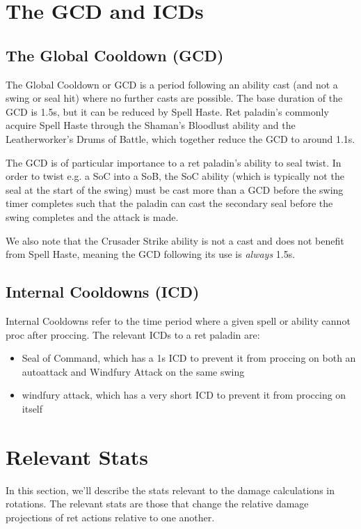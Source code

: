 \documentclass[letterpaper,11pt]{article}
\begin{document}
	\section{The GCD and ICDs}
	\subsection{The Global Cooldown (GCD)}
	The Global Cooldown or GCD is a period following an ability cast (and not a swing or seal hit) where no further casts are possible.
	The base duration of the GCD is 1.5s, but it can be reduced by Spell Haste.
	Ret paladin's commonly acquire Spell Haste through the Shaman's Bloodlust ability and the Leatherworker's Drums of Battle, which together reduce the GCD to around 1.1s.
	
	The GCD is of particular importance to a ret paladin's ability to seal twist.
	In order to twist e.g. a SoC into a SoB, the SoC ability (which is typically not the seal at the start of the swing) must be cast more than a GCD before the swing timer completes such that the paladin can cast the secondary seal before the swing completes and the attack is made.
	
	We also note that the Crusader Strike ability is not a cast and does not benefit from Spell Haste, meaning the GCD following its use is \emph{always} 1.5s.
	
	\subsection{Internal Cooldowns (ICD)}
	Internal Cooldowns refer to the time period where a given spell or ability cannot proc after proccing.
	The relevant ICDs to a ret paladin are:
	\begin{itemize}
		\item Seal of Command, which has a 1s ICD to prevent it from proccing on both an autoattack and Windfury Attack on the same swing
		\item windfury attack, which has a very short ICD to prevent it from proccing on itself
	\end{itemize}

	\section{Relevant Stats}
	In this section, we'll describe the stats relevant to the damage calculations in rotations.
	The relevant stats are those that change the relative damage projections of ret actions relative to one another.
	
\end{document}
